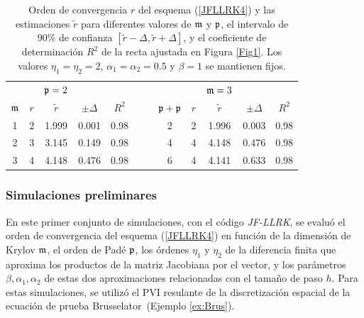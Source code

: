 \begin{table}[htb]
	\centering
	\caption{
		Orden de convergencia $r$ del esquema (\ref{JFLLRK4}) y las estimaciones $\widetilde{r}$ para diferentes valores de $\mathfrak{m}$ y $\mathfrak{p}$, el intervalo de $90\%$ de confianza $[\widetilde{r}-\varDelta,\widetilde{r}+\varDelta]$, y el coeficiente de determinación $R^2$ de la recta ajustada en Figura \ref{Fig1}. Los valores $\eta_1=\eta_2=2$, $\alpha_1=\alpha_2=0\mathord{.}5$ y $\beta=1$ se mantienen fijos.}
	\begin{adjustbox}{width=0.8\columnwidth,center}
		\begin{tabular}{cccccllccccc}
			\cline{1-12}
			&  & $\mathfrak{p}=2$ &  &  &  &  &  &  & $\mathfrak{m}=3$ &  &  \\ \cline{2-5}\cline{9-12}
			$\mathfrak{m}$ & $r$ & $\widetilde{r}$ & $\pm \varDelta$ & $R^{2}$ &  &  & $\mathfrak{p}+\mathfrak{p}$
			& $r$ & $\widetilde{r}$ & $\pm \varDelta$ & $R^{2}$ \\
			\cline{1-5}\cline{8-12}
			1 & 2 & 1.999 & 0.001 & 0.98 &  &  & 2 & 2 & 1.996 & 0.003 & 0.98 \\
			2 & 3 & 3.145 & 0.149 & 0.98 &  &  & 4 & 4 & 4.148 & 0.476 & 0.98 \\
			3 & 4 & 4.148 & 0.476 & 0.98 &  &  & 6 & 4 & 4.141 & 0.633 & 0.98 \\
			\cline{1-12}
		\end{tabular}
	\end{adjustbox}
	\label{tab:mporders}
\end{table}

\subsubsection{Simulaciones preliminares}
En este primer conjunto de simulaciones, con el código \textit{JF-LLRK}, se evaluó el orden de convergencia del esquema (\ref{JFLLRK4}) en función de la dimensión de Krylov $\mathfrak{m}$, el orden de Padé $\mathfrak{p}$, los órdenes $\eta_1$ y $\eta_2$ de la diferencia finita que aproxima los productos de la matriz Jacobiana por el vector, y los parámetros $\beta,\alpha_1,\alpha_2$ de estas dos aproximaciones relacionadas con el tamaño de paso $h$. Para estas simulaciones, se utilizó el PVI resulante de la discretización espacial de la ecuación de prueba  Brusselator~(Ejemplo \ref{ex:Brus}).

\vspace{0.3cm}

